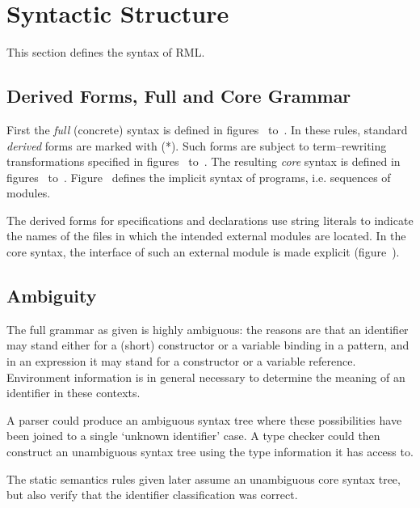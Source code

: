 %
\section{Syntactic Structure}

This section defines the syntax of RML.

\subsection{Derived Forms, Full and Core Grammar}

First the \emph{full} (concrete) syntax is defined in figures~
to~.
In these rules, standard \emph{derived} forms are marked with (*).
Such forms are subject to term--rewriting transformations
specified in figures~ to~.
The resulting \emph{core} syntax is defined in
figures~ to~.
Figure~ defines the implicit syntax of programs,
i.e. sequences of modules.

The derived forms for \verb@with@ specifications and
declarations use string literals to indicate the names of the files
in which the intended external modules are located. In the
core syntax, the interface of such an external module is made
explicit (figure~).

\subsection{Ambiguity}

The full grammar as given is highly ambiguous: the reasons are that an identifier
may stand either for a (short) constructor or a variable binding in a pattern, and
in an expression it may stand for a constructor or a variable reference.
Environment information is in general necessary
to determine the meaning of an identifier in these contexts.

A parser could produce an ambiguous syntax tree where these possibilities
have been joined to a single `unknown identifier' case. A type checker
could then construct an unambiguous syntax tree using the type information
it has access to.

The static semantics rules given later assume an unambiguous core syntax tree,
but also verify that the identifier classification was correct.

